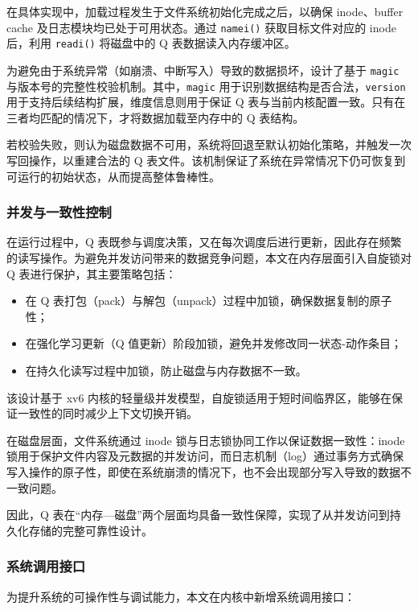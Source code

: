 在具体实现中，加载过程发生于文件系统初始化完成之后，以确保 inode、buffer cache 及日志模块均已处于可用状态。通过 \texttt{namei()} 获取目标文件对应的 inode 后，利用 \texttt{readi()} 将磁盘中的 Q 表数据读入内存缓冲区。

为避免由于系统异常（如崩溃、中断写入）导致的数据损坏，设计了基于 \texttt{magic} 与版本号的完整性校验机制。其中，\texttt{magic} 用于识别数据结构是否合法，\texttt{version} 用于支持后续结构扩展，维度信息则用于保证 Q 表与当前内核配置一致。只有在三者均匹配的情况下，才将数据加载至内存中的 Q 表结构。

若校验失败，则认为磁盘数据不可用，系统将回退至默认初始化策略，并触发一次写回操作，以重建合法的 Q 表文件。该机制保证了系统在异常情况下仍可恢复到可运行的初始状态，从而提高整体鲁棒性。

\subsubsection{并发与一致性控制}

在运行过程中，Q 表既参与调度决策，又在每次调度后进行更新，因此存在频繁的读写操作。为避免并发访问带来的数据竞争问题，本文在内存层面引入自旋锁对 Q 表进行保护，其主要策略包括：

\begin{itemize}
\item 在 Q 表打包（pack）与解包（unpack）过程中加锁，确保数据复制的原子性；
\item 在强化学习更新（Q 值更新）阶段加锁，避免并发修改同一状态-动作条目；
\item 在持久化读写过程中加锁，防止磁盘与内存数据不一致。
\end{itemize}

该设计基于 xv6 内核的轻量级并发模型，自旋锁适用于短时间临界区，能够在保证一致性的同时减少上下文切换开销。

在磁盘层面，文件系统通过 inode 锁与日志锁协同工作以保证数据一致性：inode 锁用于保护文件内容及元数据的并发访问，而日志机制（log）通过事务方式确保写入操作的原子性，即使在系统崩溃的情况下，也不会出现部分写入导致的数据不一致问题。

因此，Q 表在“内存—磁盘”两个层面均具备一致性保障，实现了从并发访问到持久化存储的完整可靠性设计。

\subsubsection{系统调用接口}

为提升系统的可操作性与调试能力，本文在内核中新增系统调用接口：


